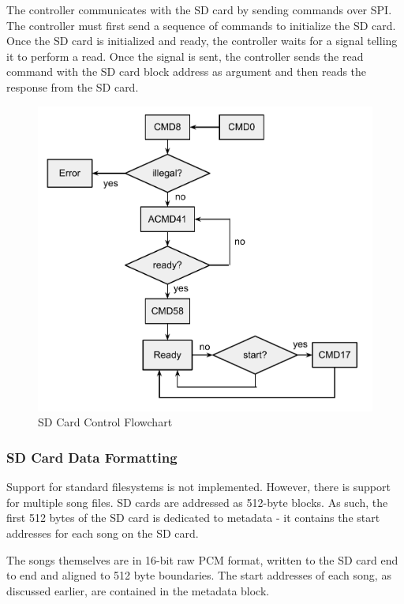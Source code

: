 \documentclass{article}
\begin{document}
The controller communicates with the SD card by sending commands over SPI.
The controller must first send a sequence of commands to initialize the SD card.
Once the SD card is initialized and ready, the controller waits for a signal
telling it to perform a read. Once the signal is sent, the controller sends
the read command with the SD card block address as argument and then reads
the response from the SD card.

\begin{figure}[H]
	\centering
	\includegraphics[scale=0.3]{sd-controller}
	\caption{SD Card Control Flowchart}
\end{figure}

\subsubsection{SD Card Data Formatting}

Support for standard filesystems is not implemented. However, there is support
for multiple song files. SD cards are addressed as 512-byte blocks. As such,
the first 512 bytes of the SD card is dedicated to metadata - it contains the
start addresses for each song on the SD card.

The songs themselves are in 16-bit raw PCM format, written to the SD card end
to end and aligned to 512 byte boundaries. The start addresses of each
song, as discussed earlier, are contained in the metadata block.
\end{document}
